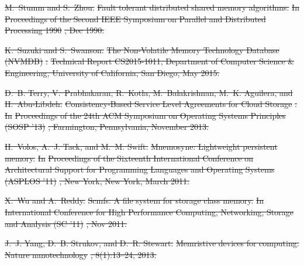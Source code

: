 \documentclass[sigconf]{acmart}
\renewcommand{\em}{\it}
\providecommand{\DIFdel}[1]{{\protect\color{red}\sout{#1}}}                      %
\begin{document}
{%
\DIFdel{M.~Stumm and S.~Zhou.
}%
\DIFdel{Fault tolerant distributed shared memory algorithms.
}%
\DIFdel{In }%
\DIFdel{Proceedings of the Second IEEE Symposium on Parallel and
  Distributed Processing 1990}%
\DIFdel{, Dec 1990.
}%

\DIFdel{K.~Suzuki and S.~Swanson.
}%
\DIFdel{The Non-Volatile Memory Technology Database (NVMDB)}%
\DIFdel{.
}%
\DIFdel{Technical Report CS2015-1011, Department of Computer Science \&
  Engineering, University of California, San Diego, May 2015.
}%

\DIFdel{D.~B. Terry, V.~Prabhakaran, R.~Kotla, M.~Balakrishnan, M.~K. Aguilera, and
  H.~Abu-Libdeh.
}%
\DIFdel{Consistency-Based Service Level Agreements for Cloud Storage}%
\DIFdel{.
}%
\DIFdel{In }%
\DIFdel{Proceedings of the 24th ACM Symposium on Operating Systems
  Principles (SOSP '13)}%
\DIFdel{, Farmington, Pennsylvania, November 2013.
}%

\DIFdel{H.~Volos, A.~J. Tack, and M.~M. Swift.
}%
\DIFdel{Mnemosyne: Lightweight persistent memory.
}%
\DIFdel{In }%
\DIFdel{Proceedings of the Sixteenth International Conference on
  Architectural Support for Programming Languages and Operating Systems (ASPLOS
  '11)}%
\DIFdel{, New York, New York, March 2011.
}%

\DIFdel{X.~Wu and A.~Reddy.
}%
\DIFdel{Scmfs: A file system for storage class memory.
}%
\DIFdel{In }%
\DIFdel{International Conference for High Performance Computing,
  Networking, Storage and Analysis (SC '11)}%
\DIFdel{, Nov 2011.
}%

\DIFdel{J.~J. Yang, D.~B. Strukov, and D.~R. Stewart.
}%
\DIFdel{Memristive devices for computing.
}%
\DIFdel{Nature nanotechnology}%
\DIFdel{, 8(1):13--24, 2013.
}%

}
\end{document}
